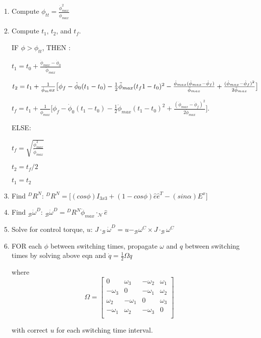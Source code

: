 \documentclass{article}
\begin{document}
\begin{enumerate}
\begin{enumerate}
		\item Compute $\phi_{tt} = \frac{\dot{\phi}_{max}^2}{\ddot{\phi}_{max}}$
		
		\item Compute $t_1$, $t_2$, and $t_f$. 
		
		IF $\phi > \phi_{tt}$, THEN : 
		
		$
			t_1 = t_0 + \frac{\dot{\phi}_{max} - \dot{\phi}_0}{\ddot{\phi}_{max}}
		$ 
		
		$
			t_2 = t_1 + \frac{1}{\dot{\phi}_max} \big[ \phi_f - \dot{\phi}_0 (t_1 - t_0) - \frac{1}{2} \ddot{\phi}_{max} (t_f1 - t_0)^2 - \\ \frac{\dot{\phi}_{max} ( \dot{\phi}_{max} -  \dot{\phi}_f ) }{\ddot{\phi}_{max}} + \frac{ (\dot{\phi}_{max} - \dot{\phi}_f)^2}{2 \ddot{\phi}_{max}} \big]
		$
		
		$
			 t_f=t_1+\frac{1}{\dot{\phi}_{max}}\Big[ \phi_f-\dot{\phi}_0(t_1-t_0)-\frac{1}{2}\ddot{\phi}_{max}(t_1-t_0)^2+\frac{(\dot{\phi}_{max}-\dot{\phi}_f)^2}{2\ddot{\phi}_{max}} \Big].
		$
		
		ELSE: 
		
		$ t_f = \sqrt{\frac{\dot{\phi}_{max}^2}{\ddot{\phi}_{max}}}
		$
		
		$ t_2 = t_f / 2 $ 
		
		$ t_1 = t_2 $ 
		
		\item Find ${}^DR^N$: 
		$
		{}^DR^N = \big[(cos\phi)I_{3x3} + (1 - cos\phi)\hat{e}\hat{e}^T - (sin\alpha)E^x \big]
		$
		
		\item Find $_\mathcal{B}\dot{\omega}^{D}$: 
		$
		_\mathcal{B}\dot{\omega}^{D} = {}^DR^N \ddot{\phi}_{max} \cdot _\mathcal{N}\hat{e}
		$
		
		\item Solve for control torque, $u$: 
		$
		J \cdot _\mathcal{B}\dot{\omega}^D = u - _\mathcal{B}\omega^C \times J \cdot _\mathcal{B}\omega^C 
		$
		
		\item FOR each $\phi$ between switching times, propagate $\omega$ and $q$ between switching times by solving above eqn and 
		$
		\dot{q} = \frac{1}{2} \Omega q 
		$
		
		where
			\[ \Omega = \left[ \begin{array}{cccc}
				0 & \omega_3 & -\omega_2 & \omega_1 \\
				-\omega_3 & 0 & -\omega_1 & \omega_2 \\
				\omega_2 & -\omega_1 & 0 & \omega_3 \\ 
				-\omega_1 & \omega_2 & -\omega_3 & 0 \\ 
			\end{array} \right] \] 
			
		with correct $u$ for each switching time interval. 
			
	\end{enumerate} 
\end{enumerate}

\end{document}
